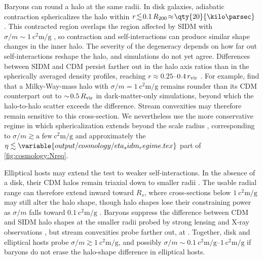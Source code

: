 \documentclass[linenumbers,twocolumn]{aastex701}
\begin{document}
        Baryons can round a halo at the same radii. %
        In disk galaxies, adiabatic contraction sphericalizes the halo within $r\!\lesssim\!0.1\,R_{200}\!\approx\!\qty{20}{\kilo\parsec}$ \citep{Kazantzidis+:2004:EffectGasCooling,Sameie+:2018:ImpactBaryonicDiscs,Chua+:2022:ImpactGalacticFeedback}. %
        This contracted region overlaps the region affected by \gls{SIDM} with $\sigma/m\sim\qty{1}{\square\centi\meter\per\gram}$ \citep{Peter+:2013:CosmologicalSimulationsSelfInteracting,Brinckmann+:2018:StructureAssemblyHistory}, so contraction and self-interactions can produce similar shape changes in the inner halo. %
        The severity of the degeneracy depends on how far out self-interactions reshape the halo, and simulations do not yet agree. %
        Differences between \gls{SIDM} and \gls{CDM} persist farther out in the halo axis ratios than in the spherically averaged density profiles, reaching $r\approx0.25$--$0.4\,r_{\rm vir}$ \citep{Fischer+:2022:CosmologicalSimulationsRare}. %
        For example, \citet{Fischer+:2024:CosmologicalIdealizedSimulations} find that a Milky-Way-mass halo with $\sigma/m=\qty{1}{\square\centi\meter\per\gram}$ remains rounder than its \gls{CDM} counterpart out to $\sim\!0.5\,R_{\rm vir}$ in dark-matter-only simulations, beyond which the halo-to-halo scatter exceeds the difference. %
        Stream convexities may therefore remain sensitive to this cross-section. %
        We nevertheless use the more conservative regime in which sphericalization extends beyond the scale radius \citep{Vera-Ciro+:2011:ShapeDarkMatter}, corresponding to $\sigma/m\gtrsim\text{a few}\ \unit{\square\centi\meter\per\gram}$ and approximately the $\eta\lesssim\variable{output/cosmology/eta_sidm_regime.tex}$ part of \cref{fig:cosmology:Nreq}. %

        Elliptical hosts may extend the test to weaker self-interactions. %
        In the absence of a disk, their \gls{CDM} halos remain triaxial down to smaller radii \citep{Vera-Ciro+:2011:ShapeDarkMatter,Despali+:2022:ConstrainingSIDMHalo,Bautista+:2025:JeansModelShapes}. %
        The usable radial range can therefore extend inward toward $R_s$, where cross-sections below $\qty{1}{\square\centi\meter\per\gram}$ may still alter the halo shape, though halo shapes lose their constraining power as $\sigma/m$ falls toward $\qty{0.1}{\square\centi\meter\per\gram}$ \citep{Peter+:2013:CosmologicalSimulationsSelfInteracting}. %
        Baryons suppress the difference between \gls{CDM} and \gls{SIDM} halo shapes at the smaller radii probed by strong lensing and X-ray observations \citep{Despali+:2022:ConstrainingSIDMHalo}, but stream convexities probe farther out, at . %
        Together, disk and elliptical hosts probe $\sigma/m\gtrsim\qty{1}{\square\centi\meter\per\gram}$, and possibly $\sigma/m\sim\qtyrange{0.1}{1}{\square\centi\meter\per\gram}$ if baryons do not erase the halo-shape difference in elliptical hosts. %
\end{document}
